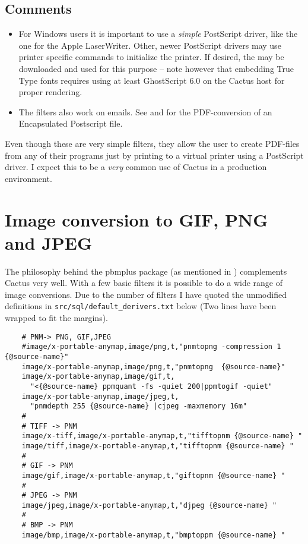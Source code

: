 \subsection*{Comments}

\begin{itemize}
\item For Windows users it is important to use a \textit{simple}
  PostScript driver, like the one for the Apple LaserWriter.  Other,
  newer PostScript drivers may use printer specific commands to
  initialize the printer.  If desired, the
   may be downloaded and used for this
  purpose -- note however that embedding True Type fonts requires
  using at least GhostScript 6.0 on the Cactus host for proper
  rendering.

\item The filters also work on emails.  See
   and
   for the PDF-conversion
  of an Encapsulated Postscript file.

\end{itemize}

Even though these are very simple filters, they allow the user to
create PDF-files from any of their programs just by printing to a
virtual printer using a PostScript driver.  I expect this to be a \textit{very}
common use of Cactus in a production environment.

\section{Image conversion to GIF, PNG and JPEG}
\label{sec:image-conversion}


The philosophy behind the pbmplus package (as mentioned in
) complements Cactus very well.  With a
few basic filters it is possible to do a wide range of image
conversions.  Due to the number of filters I have quoted the
unmodified definitions in \texttt{src/sql/default_derivers.txt} below
(Two lines have been wrapped to fit the margins).

\begin{verbatim}
    # PNM-> PNG, GIF,JPEG
    #image/x-portable-anymap,image/png,t,"pnmtopng -compression 1 {@source-name}"
    image/x-portable-anymap,image/png,t,"pnmtopng  {@source-name}"
    image/x-portable-anymap,image/gif,t,
      "<{@source-name} ppmquant -fs -quiet 200|ppmtogif -quiet"
    image/x-portable-anymap,image/jpeg,t,
      "pnmdepth 255 {@source-name} |cjpeg -maxmemory 16m"
    #
    # TIFF -> PNM
    image/x-tiff,image/x-portable-anymap,t,"tifftopnm {@source-name} "
    image/tiff,image/x-portable-anymap,t,"tifftopnm {@source-name} "
    #
    # GIF -> PNM
    image/gif,image/x-portable-anymap,t,"giftopnm {@source-name} "
    #
    # JPEG -> PNM
    image/jpeg,image/x-portable-anymap,t,"djpeg {@source-name} "
    #
    # BMP -> PNM
    image/bmp,image/x-portable-anymap,t,"bmptoppm {@source-name} "
\end{verbatim}


